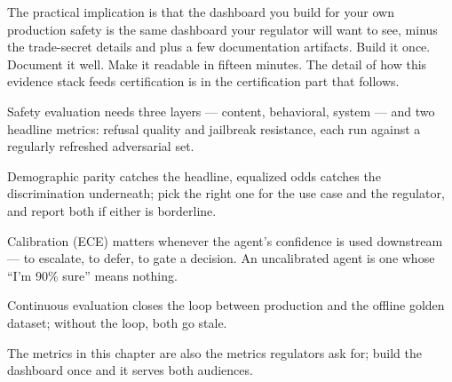 The practical implication is that the dashboard you build for your own production safety is the same dashboard your regulator will want to see, minus the trade-secret details and plus a few documentation artifacts. Build it once. Document it well. Make it readable in fifteen minutes. The detail of how this evidence stack feeds certification is in the certification part that follows.

\TNrule

\stoptwocol

\begin{TNkeytakeaways}
\item Safety evaluation needs three layers --- content, behavioral, system --- and two headline metrics: refusal quality and jailbreak resistance, each run against a regularly refreshed adversarial set.
\item Demographic parity catches the headline, equalized odds catches the discrimination underneath; pick the right one for the use case and the regulator, and report both if either is borderline.
\item Calibration (ECE) matters whenever the agent's confidence is used downstream --- to escalate, to defer, to gate a decision. An uncalibrated agent is one whose ``I'm 90\% sure'' means nothing.
\item Continuous evaluation closes the loop between production and the offline golden dataset; without the loop, both go stale.
\item The metrics in this chapter are also the metrics regulators ask for; build the dashboard once and it serves both audiences.
\end{TNkeytakeaways}

